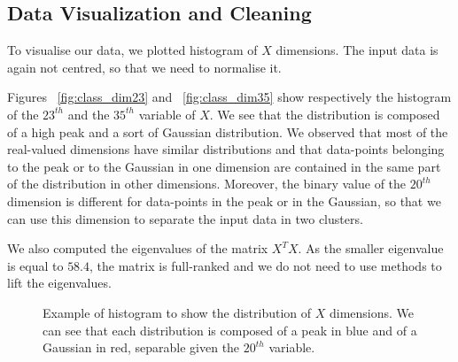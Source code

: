 \documentclass{article} %
\begin{document}
\subsection{Data Visualization and Cleaning}
To visualise our data, we plotted histogram of $X$ dimensions. The input data is again not centred, so that we need to normalise it.

Figures ~\ref{fig:class_dim23} and ~\ref{fig:class_dim35} show respectively the histogram of the $23^{th}$ and the $35^{th}$ variable of $X$. We see that the distribution is composed of a high peak and a sort of Gaussian distribution. We observed that most of the real-valued dimensions have similar distributions and that data-points belonging to the peak or to the Gaussian in one dimension are contained in the same part of the distribution in other dimensions. Moreover, the binary value of the $20^{th}$ dimension is different for data-points in the peak or in the Gaussian, so that we can use this dimension to separate the input data in two clusters.

We also computed the eigenvalues of the matrix $X^{T}X$. As the smaller eigenvalue is equal to $58.4$, the matrix is full-ranked and we do not need to use methods to lift the eigenvalues.

\begin{figure}[!h] %
	\center
	\hfill
	\caption{Example of histogram to show the distribution of $X$ dimensions. We can see that each distribution is composed of a peak in blue and of a Gaussian in red, separable given the $20^{th}$ variable.}
\end{figure}
\end{document}
